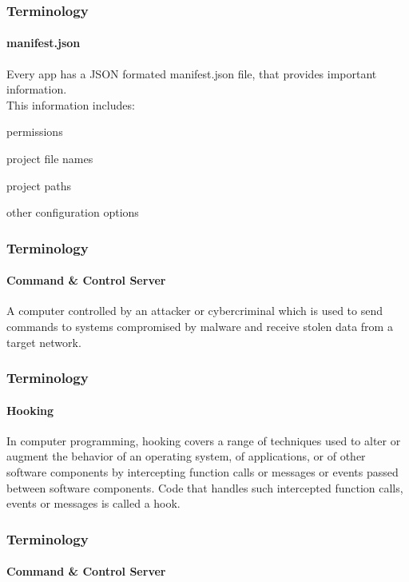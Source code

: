 \documentclass[aspectratio=169]{beamer}
\begin{document}
\begin{frame}
  \frametitle{Terminology}
  \framesubtitle{manifest.json}
  \begin{center}
    \begin{tcolorbox}[title=\href{https://developer.chrome.com/apps/manifest}{manifest.json definition},colback=gray]
      Every app has a JSON formated manifest.json file, that provides important information.\\
      \newline
      This information includes:\\
      \begin{itemize}
      {\color{black}
      \item permissions
      \item project file names
      \item project paths
      \item other configuration options}
      \end{itemize}
    \end{tcolorbox}
  \end{center}
\end{frame}

\begin{frame}
  \frametitle{Terminology}
  \framesubtitle{Command \& Control Server}
  \begin{center}
    \begin{tcolorbox}[title=\href{https://en.wikipedia.org/wiki/Botnet}{Command and Control Server Definition},colback=gray]
      A computer controlled by an attacker or cybercriminal which is used to send commands to systems compromised by malware and receive stolen data from a target network.
    \end{tcolorbox}
  \end{center}
\end{frame}

\begin{frame}
  \frametitle{Terminology}
  \framesubtitle{Hooking}
  \begin{center}
    \begin{tcolorbox}[title=\href{https://en.wikipedia.org/wiki/Hooking}{Hooking Definition},colback=gray]
      In computer programming, hooking covers a range of techniques used to alter or augment the behavior of an operating system, of applications, or of other software components by intercepting function calls or messages or events passed between software components. Code that handles such intercepted function calls, events or messages is called a hook.
    \end{tcolorbox}
  \end{center}
\end{frame}

\begin{frame}
  \frametitle{Terminology}
  \framesubtitle{Command \& Control Server}
  \begin{center}
  \end{center}
\end{frame}
\end{document}
